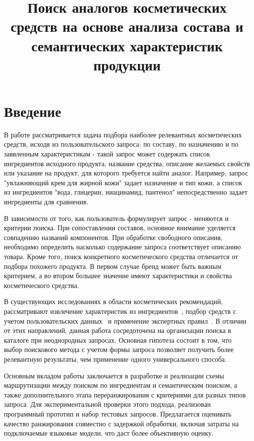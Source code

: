 \documentclass{misisarticle}
\title{Поиск аналогов косметических средств на основе анализа состава и семантических характеристик продукции}
\begin{document}
\maketitle

\section{Введение}

В работе рассматривается задача подбора наиболее релевантных косметических средств, исходя из пользовательского запроса: по составу, по назначению и по заявленным характеристикам - такой запрос может содержать список ингредиентов исходного продукта, название средства, описание желаемых свойств или указание на продукт, для которого требуется найти аналог. Например, запрос "увлажняющий крем для жирной кожи" задает назначение и тип кожи, а список из ингредиентов "вода, глицерин, ниацинамид, пантенол" непосредственно задает ингредиенты для сравнения.

В зависимости от того, как пользователь формулирует запрос - меняются и критерии поиска. При сопоставлении составов, основное внимание уделяется совпадению названий компонентов. При обработке свободного описания, необходимо определить насколько содержание запроса соответствует описанию товара. Кроме того, поиск конкретного косметического средства отличается от подбора похожего продукта. В первом случае бренд может быть важным критерием, а во втором большее значение имеют характеристики и свойства косметического средства.

В существующих исследованиях в области косметических рекомендаций, рассматривают извлечение характеристик из ингредиентов~\cite{liu2024}, подбор средств с учетом пользовательских данных~\cite{rajegowda2024} и применение экспертных правил~\cite{fedorov2025}. В отличии от этих направлений, данная работа сосредоточена на организации поиска в каталоге при неоднородных запросах. Основная гипотеза состоит в том, что выбор поискового метода с учетом формы запроса позволяет получить более релевантную результаты, чем применение одного универсального способа.

Основным вкладом работы заключается в разработке и реализации схемы маршрутизации между поиском по ингредиентам и семантическим поиском, а также дополнительного этапа переранжирования с критериями для разных типов запроса. Для экспериментальной проверки этого подхода, реализован программный прототип и набор тестовых запросов. Предлагается оценивать качество ранжирования совместно с задержкой обработки, включая затраты на подключаемые языковые модели, что даст более объективную оценку.
\end{document}
